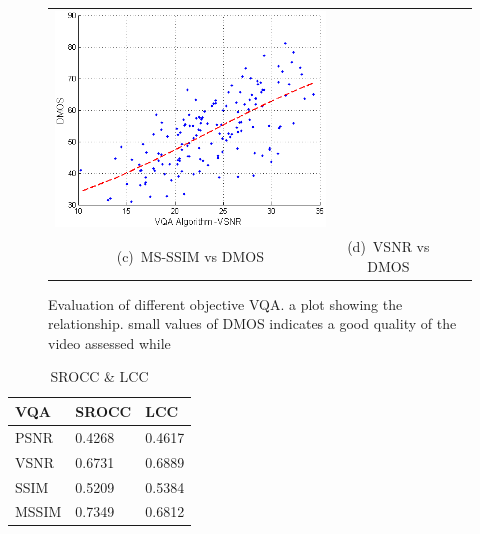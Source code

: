 \documentclass{article}
\begin{document}
\begin{figure}[h]
\begin{tabular}[h]{cc p{20em} p{20em}}
       \includegraphics[scale=.45]{vsnr} \\
        (c)~MS-SSIM vs DMOS&
        (d)~VSNR vs DMOS
    \end{tabular}
    \caption{Evaluation of different objective VQA. a plot showing the relationship. small values of DMOS indicates a good quality of the video assessed while }
    \label{fig:vqa}
\end{figure}
\begin{table}
\centering
\begin{tabular}[h]{ p{10em}  p{5em}  p{5em}}
\hline\hline
			VQA & SROCC & LCC \\\hline
			PSNR & 0.4268 &0.4617 \\ 
			VSNR &0.6731   & 0.6889 \\ 
			SSIM &0.5209  &0.5384 \\ 
			MSSIM & 0.7349 & 0.6812 \\	\hline\hline
 \end{tabular}
    \caption{SROCC \& LCC}
  \end{table}


\end{document}
